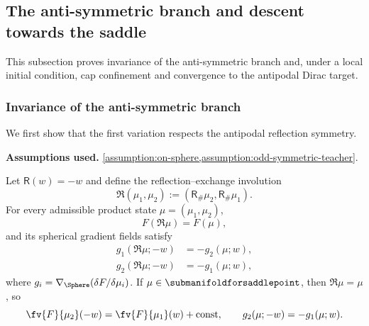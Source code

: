 
\subsection{The anti-symmetric branch and descent towards the saddle}
\label{subsec:antisymmetric-branch-and-dissipation}

This subsection proves invariance of the anti-symmetric branch and, under a local initial condition, cap confinement and convergence to the antipodal Dirac target.

\subsubsection{Invariance of the anti-symmetric branch}
\label{subsubsec:invariance}

We first show that the first variation respects the antipodal reflection symmetry.

\begin{lemma}
\label{lem:gradient-symmetry-antisymmetric-branch}
\textbf{Assumptions used.} \cref{assumption:on-sphere,assumption:odd-symmetric-teacher}.

Let \(\mathsf R(w)=-w\) and define the reflection--exchange involution
\[
 \mathfrak R(\mu_1,\mu_2)
 :=(\mathsf R_\#\mu_2,\mathsf R_\#\mu_1).
\]
For every admissible product state \(\mu=(\mu_1,\mu_2)\),
\begin{equation}
\label{eq:mf-reflection-swap-objective}
 F(\mathfrak R\mu)=F(\mu),
\end{equation}
and its spherical gradient fields satisfy
\begin{equation}
\label{eq:mf-reflection-swap-gradient}
\begin{aligned}
 g_1(\mathfrak R\mu;-w)&=-g_2(\mu;w),\\
 g_2(\mathfrak R\mu;-w)&=-g_1(\mu;w),
\end{aligned}
\end{equation}
where \(g_i=\nabla_\Sphere(\delta F/\delta\mu_i)\).
If \(\mu\in\submanifoldforsaddlepoint\), then \(\mathfrak R\mu=\mu\), so
\begin{equation}
\label{eq:full-first-variation-reflection-covariance}
 \fv{F}{\mu_2}(-w)=\fv{F}{\mu_1}(w)+\mathrm{const},
 \qquad g_2(\mu;-w)=-g_1(\mu;w).
\end{equation}
\end{lemma}

